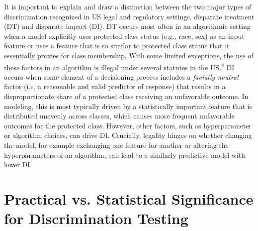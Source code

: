 \documentclass[information,article,submit,moreauthors,pdftex]{definitions/mdpi}
\begin{document}
It is important to explain and draw a distinction between the two major types of discrimination recognized in US legal and regulatory settings, disparate treatment (DT) and disparate impact (DI). DT occurs most often in an algorithmic setting when a model explicitly uses protected class status (e.g., race, sex) as an input feature or uses a feature that is so similar to protected class status that it essentially proxies for class membership.  With some limited exceptions, the use of these factors in an algorithm is illegal under several statutes in the US.\textsuperscript{4} DI occurs when some element of a decisioning process includes a \textit{facially neutral} factor (i.e, a reasonable and valid predictor of response) that results in a disproportionate share of a protected class receiving an unfavorable outcome.  In modeling, this is most typically driven by a statistically important feature that is distributed unevenly across classes, which causes more frequent unfavorable outcomes for the protected class.  However, other factors, such as hyperparameter or algorithm choices, can drive DI.  Crucially, legality hinges on whether changing the model, for example exchanging one feature for another or altering the hyperparameters of an algorithm, can lead to a similarly predictive model with lower DI.

\section{Practical vs. Statistical Significance for Discrimination Testing}\label{a_sec:prac_v_stat}
\end{document}
